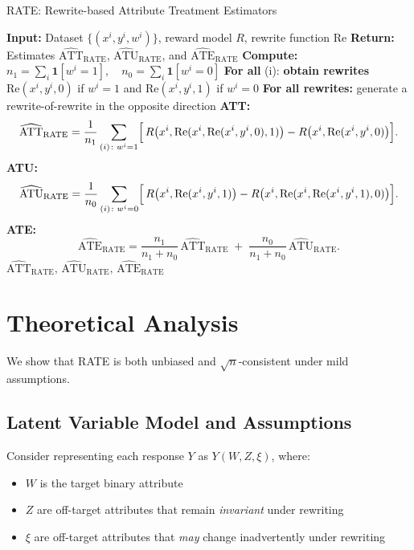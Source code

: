 \begin{algorithm}[H]
  \caption{RATE: Rewrite-based Attribute Treatment Estimators}
  \label{alg:rate}
  \begin{algorithmic}[1]
  \State \textbf{Input:} Dataset $\{(x^i, y^{i}, w^{i})\}$, reward model $R$, rewrite function $\text{Re}$
  \State \textbf{Return:} Estimates $\widehat{\text{ATT}}_{\text{RATE}}$, $\widehat{\text{ATU}}_{\text{RATE}}$, and $\widehat{\text{ATE}}_{\text{RATE}}$
  \State \textbf{Compute:} $n_1 = \sum_{i} \mathbf{1}[w^{i}=1], \quad n_0 = \sum_{i} \mathbf{1}[w^{i}=0]$
  \State \textbf{For all }(i): \textbf{obtain rewrites} $\text{Re}(x^i, y^{i}, 0)$ if $w^{i} = 1$ and $\text{Re}(x^i, y^{i}, 1)$ if $w^{i} = 0$
  \State \textbf{For all rewrites:} generate a rewrite-of-rewrite in the opposite direction
  \State \textbf{ATT:}
  \[
    \widehat{\text{ATT}}_{\text{RATE}} = \frac{1}{n_1} \sum_{(i)\colon w^{i}=1} \Bigl[\,R\bigl(x^i, \text{Re}(x^i, \text{Re}(x^i, y^{i},0),1)\bigr) - R\bigl(x^i,\text{Re}(x^i, y^{i},0)\bigr)\Bigr].
  \]
  \State \textbf{ATU:}
  \[
    \widehat{\text{ATU}}_{\text{RATE}} = \frac{1}{n_0} \sum_{(i)\colon w^{i}=0} \Bigl[\,R\bigl(x^i, \text{Re}(x^i, y^{i},1)\bigr) - R\bigl(x^i,\text{Re}(x^i, \text{Re}(x^i, y^{i},1),0)\bigr)\Bigr].
  \]
  \State \textbf{ATE: }
  \[
    \widehat{\text{ATE}}_{\text{RATE}} =
    \frac{n_1}{n_1+n_0}\,\widehat{\text{ATT}}_{\text{RATE}}
    \;+\;
    \frac{n_0}{n_1+n_0}\,\widehat{\text{ATU}}_{\text{RATE}}.
  \]
  \State \Return $\widehat{\text{ATT}}_{\text{RATE}}, \,\widehat{\text{ATU}}_{\text{RATE}}, \,\widehat{\text{ATE}}_{\text{RATE}}$
  \end{algorithmic}
\end{algorithm}

\section{Theoretical Analysis}
\label{sec:theory}

We show that RATE is both unbiased and $\sqrt{n}$-consistent under mild assumptions.

\subsection{Latent Variable Model and Assumptions}

Consider representing each response $Y$ as $Y(W, Z, \xi)$, where:
\begin{itemize}
    \item $W$ is the target binary attribute
    \item $Z$ are off-target attributes that remain \emph{invariant} under rewriting
    \item $\xi$ are off-target attributes that \emph{may} change inadvertently under rewriting
\end{itemize}

